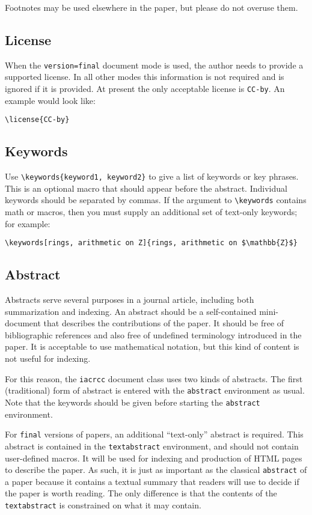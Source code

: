\documentclass{iacrcc}
\begin{document}
Footnotes may be used elsewhere in the paper, but please do not
overuse them.

\subsection{License}
When the \texttt{version=final} document mode is used, the author needs
to provide a supported license.  In all other modes this information
is not required and is ignored if it is provided.  At present the only
acceptable license is \texttt{CC-by}.  An example would look like:

\begin{verbatim}
\license{CC-by}
\end{verbatim}

\subsection{Keywords}
Use \texttt{\textbackslash keywords\{keyword1, keyword2\}} to give a
list of keywords or key phrases. This is an optional macro that should
appear before the abstract.  Individual keywords should be separated
by commas. If the argument to \texttt{\textbackslash keywords}
contains math or macros, then you must supply an additional set of
text-only keywords; for example:

\texttt{\textbackslash keywords[rings, arithmetic on Z]\{rings, arithmetic on \$\textbackslash mathbb\{Z\}\$\}}

\subsection{Abstract}
Abstracts serve several purposes in a journal article, including both
summarization and indexing. An abstract should be a self-contained
mini-document that describes the contributions of the paper. It
should be free of bibliographic references and also free of undefined
terminology introduced in the paper. It is acceptable to use
mathematical notation, but this kind of content is not useful for
indexing.

For this reason, the \texttt{iacrcc} document class uses two kinds
of abstracts. The first (traditional) form of abstract is entered with the
\texttt{abstract} environment as usual.  Note that the keywords should
be given before starting the \texttt{abstract} environment.

For \texttt{final} versions of papers, an additional ``text-only''
abstract is required. This abstract is contained in the
\texttt{textabstract} environment, and should not contain
user-defined macros.
It will be used for indexing and production of
{HTML} pages to describe the paper. As such, it is just as important
as the classical \texttt{abstract} of a paper because it contains a
textual summary that readers will use to decide if the paper is worth
reading. The only difference is that the contents of the
\texttt{textabstract} is constrained on what it may contain.
\end{document}
